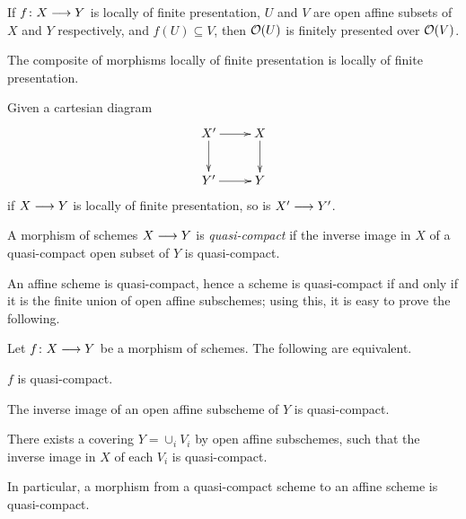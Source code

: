 \begin{1   PRELIMINARY NOTIONS}
\begin{1.1 Algebraic geometry}
\begin{proposition}
\begin{enumeratei}
\item If $f \colon X \arr Y$ is locally of finite presentation, $U$ and $V$ are open affine subsets of $X$ and $Y$ respectively, and $f(U) \subseteq V$, then $\mathcal{O}(U)$ is finitely presented over $\mathcal{O}(V)$.

\item The composite of morphisms locally of finite presentation is locally of finite presentation.

\item Given a cartesian diagram
   \[
   \xymatrix{
   X'\ar[r]\ar[d] & X\ar[d] \\
   Y' \ar[r] & Y
   }
   \]
if $X \arr Y$ is locally of finite presentation, so is $X' \arr Y'$.
\end{enumeratei}
\end{proposition}

\begin{definition}
A morphism of schemes $X \arr Y$ is \emph{quasi-compact} if the inverse image in $X$ of a quasi-compact open subset of $Y$ is quasi-compact.

An affine scheme is quasi-compact, hence a scheme is quasi-compact if and only if it is the finite union of open affine subschemes; using this, it is easy to prove the following.

\end{definition}

\begin{proposition}\hfil

Let $f \colon X \arr Y$ be a morphism of schemes. The following are equivalent.

\begin{enumeratei}

\item $f$ is quasi-compact.

\item The inverse image of an open affine subscheme of $Y$ is quasi-compact.

\item There exists a covering $Y = \cup_i V_i$ by open affine subschemes, such that the inverse image in $X$ of each $V_i$ is quasi-compact.
\end{enumeratei}

In particular, a morphism from a quasi-compact scheme to an affine scheme is quasi-compact.
\end{proposition}


\end{1.1 Algebraic geometry}
\end{1   PRELIMINARY NOTIONS}
